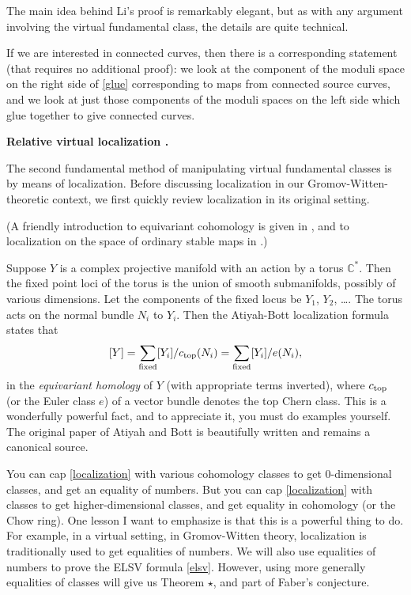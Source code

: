 \documentclass[12pt,letterpaper]{amsart}
\newcommand{\bpoint}[1]{\vspace{3mm}\par \noindent \refstepcounter{subsection}{\bf \thesubsection.} 
  {\bf #1.} }
\newcommand{\C}{\mathbb{C}}
\newcommand{\fixed}{\rm{fixed}}
\renewcommand{\top}{\rm{top}}
\newcommand{\lremind}[1]{{\bf[label:  #1]}}
\renewcommand{\lremind}[1]{{}}
\begin{document}
{The main idea behind Li's proof is remarkably elegant, but as with any argument
involving the virtual fundamental class, the details are quite technical.

If we are interested in connected curves, then there is a
corresponding statement (that requires no additional proof): we look
at the component of the moduli space on the right side of \eqref{glue}
corresponding to maps from connected source curves, and we look at
just those components of the moduli spaces on the left side which glue
together to give connected curves.

\bpoint{Relative virtual localization \cite{thmstar}} 

The second fundamental method of manipulating virtual fundamental
classes is by means of localization.  Before discussing localization
in our Gromov-Witten-theoretic context, we first quickly review
localization in its original setting.

(A friendly introduction to equivariant cohomology is given in
\cite[Ch.~4]{mirsym}, and to localization on the space of ordinary
stable maps in \cite[Ch.~27]{mirsym}.)

Suppose $Y$ is a complex projective manifold with an action by a torus
$\C^*$.  Then the fixed point loci of the torus is the union of
smooth submanifolds, possibly of various dimensions.  Let the
components of the fixed locus be $Y_1$, $Y_2$, \dots.  The torus acts
on the normal bundle $N_i$ to $Y_i$.  Then the Atiyah-Bott localization
formula states that\lremind{localization}
\begin{equation}
\label{localization}
[Y] = \sum_{\fixed} [Y_i] / c_{\top}(N_i) =
\sum_{\fixed} [Y_i] / e(N_i),
\end{equation} in the {\em equivariant homology} of $Y$
(with appropriate terms inverted),
where $c_{\top}$ (or the Euler class $e$) of a vector bundle 
denotes
the top Chern class.  This is a wonderfully powerful fact, and to
appreciate it, you must do examples yourself.  The original paper
of Atiyah and Bott  \cite{ab} is beautifully written and remains a canonical
source.


You can cap \eqref{localization} with various cohomology classes to
get $0$-dimensional classes, and get an equality of numbers.
But you can cap \eqref{localization} with classes to get
higher-dimensional classes, and get equality in cohomology (or the
Chow ring).  One lesson I want to emphasize is that this is a powerful
thing to do.  For example, in a virtual setting, in Gromov-Witten
theory, localization is traditionally used to get equalities of
numbers.  We will also use equalities of numbers to prove the ELSV
formula \eqref{elsv}.  However, using more generally equalities of
classes will give us Theorem $\star$, and part of Faber's conjecture.

}
\end{document}
